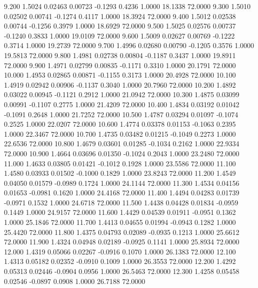    9.200   1.5024   0.02463   0.00723  -0.1293   0.4236   1.0000  18.1338  72.0000
   9.300   1.5010   0.02502   0.00741  -0.1274   0.4117   1.0000  18.3924  72.0000
   9.400   1.5012   0.02538   0.00744  -0.1256   0.3979   1.0000  18.6929  72.0000
   9.500   1.5025   0.02576   0.00737  -0.1240   0.3833   1.0000  19.0109  72.0000
   9.600   1.5009   0.02627   0.00769  -0.1222   0.3714   1.0000  19.2739  72.0000
   9.700   1.4996   0.02680   0.00790  -0.1205   0.3576   1.0000  19.5813  72.0000
   9.800   1.4981   0.02738   0.00804  -0.1187   0.3437   1.0000  19.8911  72.0000
   9.900   1.4971   0.02799   0.00835  -0.1171   0.3310   1.0000  20.1791  72.0000
  10.000   1.4953   0.02865   0.00871  -0.1155   0.3173   1.0000  20.4928  72.0000
  10.100   1.4919   0.02942   0.00906  -0.1137   0.3040   1.0000  20.7960  72.0000
  10.200   1.4892   0.03022   0.00945  -0.1121   0.2912   1.0000  21.0942  72.0000
  10.300   1.4875   0.03099   0.00991  -0.1107   0.2775   1.0000  21.4209  72.0000
  10.400   1.4834   0.03192   0.01042  -0.1091   0.2648   1.0000  21.7252  72.0000
  10.500   1.4787   0.03294   0.01097  -0.1074   0.2525   1.0000  22.0207  72.0000
  10.600   1.4774   0.03378   0.01153  -0.1063   0.2395   1.0000  22.3467  72.0000
  10.700   1.4735   0.03482   0.01215  -0.1049   0.2273   1.0000  22.6536  72.0000
  10.800   1.4679   0.03601   0.01285  -0.1034   0.2162   1.0000  22.9334  72.0000
  10.900   1.4664   0.03696   0.01350  -0.1024   0.2043   1.0000  23.2480  72.0000
  11.000   1.4633   0.03805   0.01421  -0.1012   0.1928   1.0000  23.5586  72.0000
  11.100   1.4580   0.03933   0.01502  -0.1000   0.1829   1.0000  23.8243  72.0000
  11.200   1.4549   0.04050   0.01579  -0.0989   0.1724   1.0000  24.1144  72.0000
  11.300   1.4534   0.04156   0.01653  -0.0981   0.1620   1.0000  24.4168  72.0000
  11.400   1.4494   0.04283   0.01739  -0.0971   0.1532   1.0000  24.6718  72.0000
  11.500   1.4438   0.04428   0.01834  -0.0959   0.1449   1.0000  24.9157  72.0000
  11.600   1.4429   0.04539   0.01911  -0.0951   0.1362   1.0000  25.1846  72.0000
  11.700   1.4413   0.04655   0.01994  -0.0943   0.1282   1.0000  25.4420  72.0000
  11.800   1.4375   0.04793   0.02089  -0.0935   0.1213   1.0000  25.6612  72.0000
  11.900   1.4324   0.04948   0.02189  -0.0925   0.1141   1.0000  25.8934  72.0000
  12.000   1.4319   0.05066   0.02267  -0.0916   0.1070   1.0000  26.1383  72.0000
  12.100   1.4313   0.05182   0.02352  -0.0910   0.1009   1.0000  26.3553  72.0000
  12.200   1.4292   0.05313   0.02446  -0.0904   0.0956   1.0000  26.5463  72.0000
  12.300   1.4258   0.05458   0.02546  -0.0897   0.0908   1.0000  26.7188  72.0000
